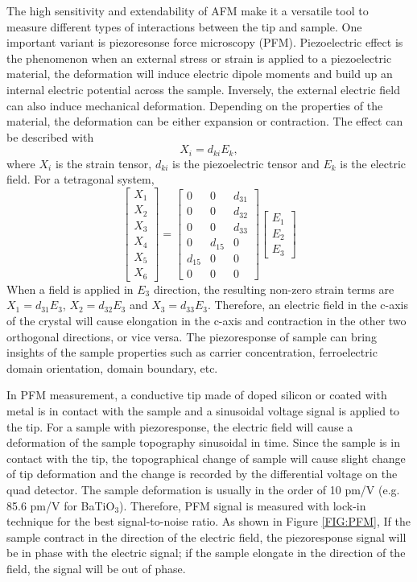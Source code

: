 \documentclass[pdflatex, sectionletters, 12pt]{pittetd}    %
\begin{document}
The high sensitivity and extendability of AFM make it a versatile tool to measure different types of interactions between the tip and sample. One important variant is piezoresonse force microscopy (PFM). Piezoelectric effect is the phenomenon when an external stress or strain is applied to a piezoelectric material, the deformation will induce electric dipole moments and build up an internal electric potential across the sample. Inversely, the external electric field can also induce mechanical deformation. Depending on the properties of the material, the deformation can be either expansion or contraction. The effect can be described with
$$
X_i = d_{ki}E_k,
$$
where $X_i$ is the strain tensor, $d_{ki}$ is the piezoelectric tensor and $E_k$ is the electric field. For a tetragonal system, 
$$
\begin{bmatrix}
X_{1} \\
X_{2} \\
X_{3} \\
X_{4} \\
X_{5} \\
X_{6}
\end{bmatrix} =
\begin{bmatrix}
0 & 0 & d_{31} \\
0 & 0 & d_{32} \\
0 & 0 & d_{33} \\
0 & d_{15} & 0 \\
d_{15} & 0 & 0 \\
0 & 0 & 0
\end{bmatrix}
\begin{bmatrix}
E_{1} \\
E_{2} \\
E_{3}
\end{bmatrix}
$$
When a field is applied in $E_3$ direction, the resulting non-zero strain terms are $X_1 = d_{31}E_3$, $X_2 = d_{32}E_3$ and $X_3 = d_{33}E_3$. Therefore, an electric field in the c-axis of the crystal will cause elongation in the c-axis and contraction in the other two orthogonal directions, or vice versa. The piezoresponse of sample can bring insights of the sample properties such as carrier concentration\cite{}, ferroelectric domain orientation\cite{}, domain boundary\cite{}, etc.

In PFM measurement, a conductive tip made of doped silicon or coated with metal is in contact with the sample and a sinusoidal voltage signal is applied to the tip. For a sample with piezoresponse, the electric field will cause a deformation of the sample topography sinusoidal in time. Since the sample is in contact with the tip, the topographical change of sample will cause slight change of tip deformation and the change is recorded by the differential voltage on the quad detector. The sample deformation is usually in the order of 10 pm/V (e.g. 85.6 pm/V for BaTiO$_3$\cite{}). Therefore, PFM signal is measured with lock-in technique for the best signal-to-noise ratio. As shown in Figure \ref{FIG:PFM}, If the sample contract in the direction of the electric field, the piezoresponse signal will be in phase with the electric signal; if the sample elongate in the direction of the field, the signal will be out of phase.
\end{document}
